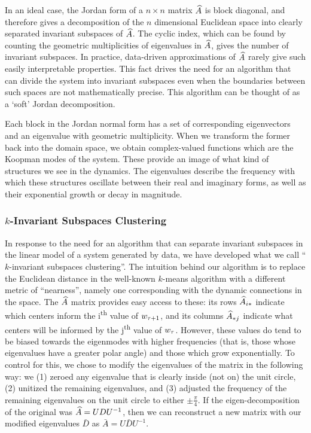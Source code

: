 In an ideal case, the Jordan form of a $n\times n$ matrix $\widehat{A}$ is block diagonal, and therefore gives a decomposition of the $n$ dimensional Euclidean space into clearly separated invariant subspaces of $\widehat{A}$. The cyclic index, which can be found by counting the geometric multiplicities of eigenvalues in $\widehat{A}$, gives the number of invariant subspaces. In practice, data-driven approximations of $\widehat{A}$ rarely give such easily interpretable properties. This fact drives the need for an algorithm that can divide the system into invariant subspaces even when the boundaries between such spaces are not mathematically precise. This algorithm can be thought of as a `soft' Jordan decomposition.

Each block in the Jordan normal form has a set of corresponding eigenvectors and an eigenvalue with geometric multiplicity. When we transform the former back into the domain space, we obtain complex-valued functions which are the Koopman modes of the system. These provide an image of what kind of structures we see in the dynamics. The eigenvalues describe the frequency with which these structures oscillate between their real and imaginary forms, as well as their exponential growth or decay in magnitude. %


\subsubsection{$k$-Invariant Subspaces Clustering}
In response to the need for an algorithm that can separate invariant subspaces in the linear model of a system generated by data, we have developed what we call ``$k$-invariant subspaces clustering''. The intuition behind our algorithm is to replace the Euclidean distance in the well-known $k$-means algorithm with a different metric of ``nearness'', namely one corresponding with the dynamic connections in the space. The $\widehat{A}$ matrix provides easy access to these: its rows $\widehat{A}_{i\ast}$ indicate which centers inform the i\textsuperscript{th} value of $w_{\tau+1}$, and its columns $\widehat{A}_{\ast j}$ indicate what centers will be informed by the j\textsuperscript{th} value of $w_{\tau}$. However, these values do tend to be biased towards the eigenmodes with higher frequencies (that is, those whose eigenvalues have a greater polar angle) and those which grow exponentially. To  control for this, we chose to modify the eigenvalues of the matrix in the following way: we (1) zeroed any eigenvalue that is clearly inside (not on) the unit circle, (2) unitized the remaining eigenvalues, and (3) adjusted the frequency of the remaining eigenvalues on the unit circle to either $\pm \frac{\pi}{4}$. If the eigen-decomposition of the original was $\widehat{A} = UDU^{-1}$, then we can reconstruct a new matrix with our modified eigenvalues $\bar D$ as $\bar A = U\bar D U^{-1}$.

